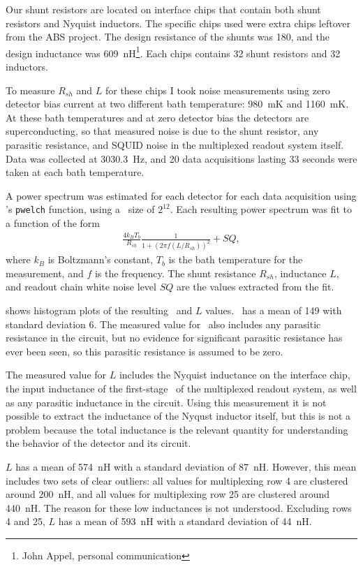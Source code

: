 Our shunt resistors are located on interface chips that contain both shunt resistors and Nyquist inductors.
The specific chips used were extra chips leftover from the ABS\cite{kusaka_modulation_2013} project.
The design resistance of the shunts was \SI{180}{\uohm}, and the design inductance was 609~nH\footnote{John Appel, personal communication}.
Each chips contains 32 shunt resistors and 32 inductors.

To measure $R_{sh}$ and $L$ for these chips I took noise measurements using zero detector bias current at two different bath temperature: 980~mK and 1160~mK.
At these bath temperatures and at zero detector bias the detectors are superconducting, so that measured noise is due to the shunt resistor, any parasitic resistance, and SQUID noise in the multiplexed readout system itself.
Data was collected at 3030.3~Hz, and 20 data acquisitions lasting 33 seconds were taken at each bath temperature.

A power spectrum was estimated for each detector for each data acquisition using \MATLAB's \texttt{pwelch} function, using a \FFT\ size of $2^{12}$.
Each resulting power spectrum was fit to a function of the form
\begin{eqnarray}\label{eqn:scnoise-fit}
	\frac{4 k_B T_b}{R_{sh}} \frac{1}{1 + (2 \pi f (L/R_{sh}))^2} + SQ,
\end{eqnarray}
where $k_B$ is Boltzmann's constant, $T_b$ is the bath temperature for the measurement, and $f$ is the frequency.
The shunt resistance $R_{sh}$, inductance $L$, and readout chain white noise level $SQ$ are the values extracted from the fit.

 shows histogram plots of the resulting \Rsh\ and $L$ values.
\Rsh\ has a mean of \SI{149}{\uohm} with standard deviation \SI{6}{\uohm}.
The measured value for \Rsh\ also includes any parasitic resistance in the circuit, but no evidence for significant parasitic resistance has ever been seen, so this parasitic resistance is assumed to be zero.

The measured value for $L$ includes the Nyquist inductance on the interface chip, the input inductance of the first-stage \SQUID\ of the multiplexed readout system, as well as any parasitic inductance in the circuit.
Using this measurement it is not possible to extract the inductance of the Nyqust inductor itself, but this is not a problem because the total inductance is the relevant  quantity for understanding the behavior of the detector and its circuit.

$L$ has a mean of 574~nH with a standard deviation of 87~nH.
However, this mean includes two sets of clear outliers: all values for multiplexing row 4 are clustered around 200~nH, and all values for multiplexing row 25 are clustered around 440~nH.
The reason for these low inductances is not understood.
Excluding rows 4 and 25,  $L$ has a mean of 593~nH with a standard deviation of 44~nH.

